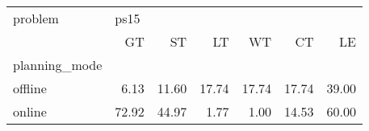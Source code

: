 \begin{tabular}{lrrrrrr}
\toprule
problem & \multicolumn{6}{l}{ps15} \\
{} &    GT &    ST &    LT &    WT &    CT &    LE \\
planning\_mode &       &       &       &       &       &       \\
\midrule
offline       &  6.13 & 11.60 & 17.74 & 17.74 & 17.74 & 39.00 \\
online        & 72.92 & 44.97 &  1.77 &  1.00 & 14.53 & 60.00 \\
\bottomrule
\end{tabular}
